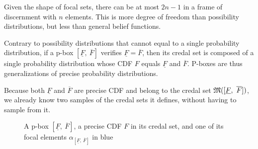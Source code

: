 Given the shape of focal sets, there can be at most $2n-1$ in a frame of discernment with $n$ elements. This is more degree of freedom than possibility distributions, but less than general belief functions.
\begin{remark}
    Contrary to possibility distributions that cannot equal to a single probability distribution, if a p-box $[\underline{F}, ~\overline{F}]$ verifies $\underline{F}=\overline{F}$, then its credal set is composed of a single probability distribution whose CDF $F$ equals $\underline{F}$ and $\overline{F}$. P-boxes are thus generalizations of precise probability distributions.
    
    Because both $\underline{F}$ and $\overline{F}$ are precise CDF and belong to the credal set ${\mathfrak{M}}([\underline{F}, ~\overline{F}])$, we already know two samples of the credal sets it defines, without having to sample from it.
\end{remark}

\begin{figure}[!ht]
    \centering
    \caption{A p-box $[\underline{F}, ~\overline{F}]$, a precise CDF $F$ in its credal set, and one of its focal elements $\alpha_{[\underline{F}, ~\overline{F}]}$ in blue}
    \label{fig:p-box}
\end{figure}



